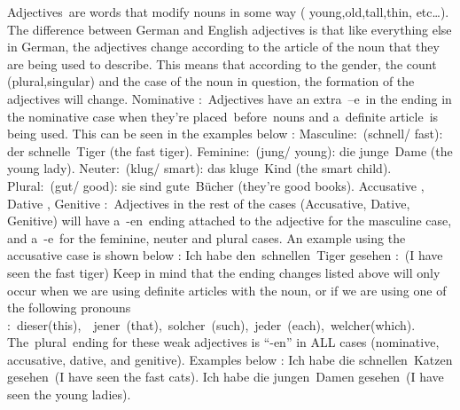 \documentclass[a4paper,12pt]{article}
\begin{document}
Adjectives are words that modify nouns in some way ( young,old,tall,thin, etc…).
The difference between German and English adjectives is that like everything
else in German, the adjectives change according to the article of the noun that
they are being used to describe. This means that according to the gender, the
count (plural,singular) and the case of the noun in question, the formation of
the adjectives will change.
Nominative : Adjectives have an extra –e in the ending in the nominative case
when they’re placed before nouns and a definite article is being used. This can
be seen in the examples below :
Masculine: (schnell/ fast): der schnelle Tiger (the fast tiger).
Feminine: (jung/ young): die junge Dame (the young lady).
Neuter: (klug/ smart): das kluge Kind (the smart child).
Plural: (gut/ good): sie sind gute Bücher (they’re good books).
Accusative , Dative , Genitive : Adjectives in the rest of the cases
(Accusative, Dative, Genitive) will have a -en ending attached to the adjective
for the masculine case, and a -e for the feminine, neuter and plural cases. An
example using the accusative case is shown below :
Ich habe den schnellen Tiger gesehen : (I have seen the fast tiger)
Keep in mind that the ending changes listed above will only occur when we are
using definite articles with the noun, or if we are using one of the following
pronouns
: dieser(this),  jener (that), solcher (such), jeder (each), welcher(which).
The plural ending for these weak adjectives is “-en” in ALL cases (nominative,
accusative, dative, and genitive). Examples below :
Ich habe die schnellen Katzen gesehen (I have seen the fast cats).
Ich habe die jungen Damen gesehen (I have seen the young ladies).\\

\justify
\end{document}
